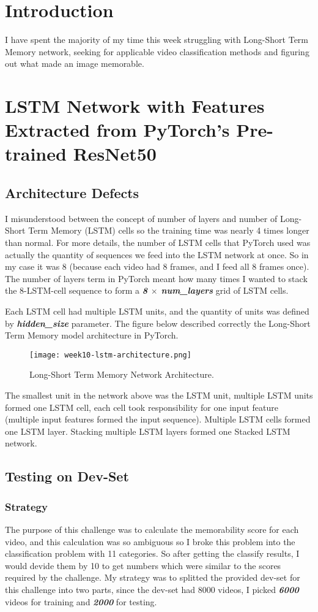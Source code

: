 \section{Introduction}
I have spent the majority of my time this week struggling with Long-Short Term Memory network, seeking for applicable video classification methods and figuring out what made an image memorable.

\section{LSTM Network with Features Extracted from PyTorch's Pre-trained ResNet50}
\subsection{Architecture Defects}
I misunderstood between the concept of number of layers and number of Long-Short Term Memory (LSTM) cells so the training time was nearly 4 times longer than normal. For more details, the number of LSTM cells that PyTorch used was actually the quantity of sequences we feed into the LSTM network at once. So in my case it was 8 (because each video had 8 frames, and I feed all 8 frames once). The number of layers term in PyTorch meant how many times I wanted to stack the 8-LSTM-cell sequence to form a  \textbf{\emph{8 \( \times \) num\_layers}} grid of LSTM cells.

Each LSTM cell had multiple LSTM units, and the quantity of units was defined by \textbf{\emph{hidden\_size}} parameter. The figure below described correctly the Long-Short Term Memory model architecture in PyTorch.

\begin{figure}[!ht]
\centering
\texttt{[image: week10-lstm-architecture.png]}
\caption{Long-Short Term Memory Network Architecture.}
\end{figure}

The smallest unit in the network above was the LSTM unit, multiple LSTM units formed one LSTM cell, each cell took responsibility for one input feature (multiple input features formed the input sequence). Multiple LSTM cells formed one LSTM layer. Stacking multiple LSTM layers formed one Stacked LSTM network.

\subsection{Testing on Dev-Set}
\subsubsection{Strategy}
The purpose of this challenge was to calculate the memorability score for each video, and this calculation was so ambiguous so I broke this problem into the classification problem with 11 categories. So after getting the classify results, I would devide them by 10 to get numbers which were similar to the scores required by the challenge. My strategy was to splitted the provided dev-set for this challenge into two parts, since the dev-set had 8000 videos, I picked \textbf{\emph{6000}} videos for training and \textbf{\emph{2000}} for testing.

